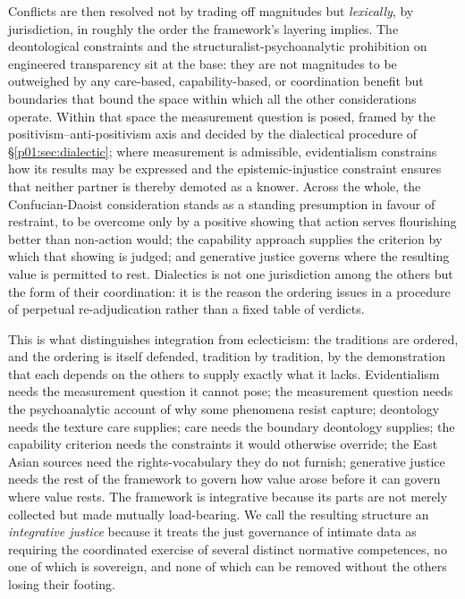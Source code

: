 \begin{small}
\begin{longtable}{@{}>{\raggedright\arraybackslash}p{} >{\raggedright\arraybackslash}p{} >{\raggedright\arraybackslash}p{}@{}}
\end{longtable}
\end{small}

\noindent Conflicts are then resolved not by trading off magnitudes but \emph{lexically}, by jurisdiction, in roughly the order the framework's layering implies. The deontological constraints and the structuralist-psychoanalytic prohibition on engineered transparency sit at the base: they are not magnitudes to be outweighed by any care-based, capability-based, or coordination benefit but boundaries that bound the space within which all the other considerations operate. Within that space the measurement question is posed, framed by the positivism--anti-positivism axis and decided by the dialectical procedure of §\ref{p01:sec:dialectic}; where measurement is admissible, evidentialism constrains how its results may be expressed and the epistemic-injustice constraint ensures that neither partner is thereby demoted as a knower. Across the whole, the Confucian-Daoist consideration stands as a standing presumption in favour of restraint, to be overcome only by a positive showing that action serves flourishing better than non-action would; the capability approach supplies the criterion by which that showing is judged; and generative justice governs where the resulting value is permitted to rest. Dialectics is not one jurisdiction among the others but the form of their coordination: it is the reason the ordering issues in a procedure of perpetual re-adjudication rather than a fixed table of verdicts.

This is what distinguishes integration from eclecticism: the traditions are ordered, and the ordering is itself defended, tradition by tradition, by the demonstration that each depends on the others to supply exactly what it lacks. Evidentialism needs the measurement question it cannot pose; the measurement question needs the psychoanalytic account of why some phenomena resist capture; deontology needs the texture care supplies; care needs the boundary deontology supplies; the capability criterion needs the constraints it would otherwise override; the East Asian sources need the rights-vocabulary they do not furnish; generative justice needs the rest of the framework to govern how value arose before it can govern where value rests. The framework is integrative because its parts are not merely collected but made mutually load-bearing. We call the resulting structure an \emph{integrative justice} because it treats the just governance of intimate data as requiring the coordinated exercise of several distinct normative competences, no one of which is sovereign, and none of which can be removed without the others losing their footing.

